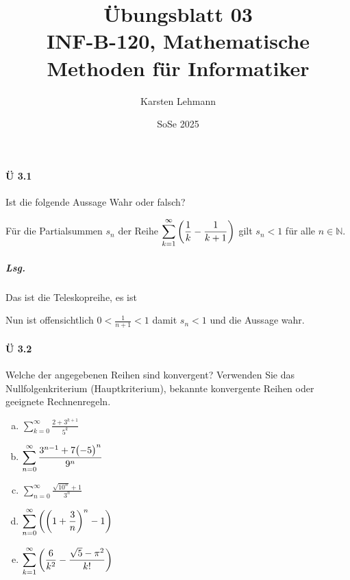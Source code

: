 \documentclass{scrreprt}
\author{Karsten Lehmann}
\date{SoSe 2025}
\title{Übungsblatt 03\\INF-B-120, Mathematische Methoden für Informatiker}
\begin{document}
\paragraph{Ü 3.1} Ist die folgende Aussage Wahr oder falsch?

Für die Partialsummen $s_n$ der Reihe
$\displaystyle \sum_{k = 1}^{\infty} \qty(\frac{1}{k} - \frac{1}{k + 1})$
gilt $s_n < 1$ für alle $n \in \mathbb{N}$.

\subparagraph{Lsg.} Das ist die Teleskopreihe, es ist
Nun ist offensichtlich $0 < \frac{1}{n + 1} < 1$ damit $s_n < 1$ und die Aussage
wahr.

\paragraph{Ü 3.2} Welche der angegebenen Reihen sind konvergent?
Verwenden Sie das Nullfolgenkriterium (Hauptkriterium), bekannte konvergente
Reihen oder geeignete Rechnenregeln.

\begin{multicols}{3}
  \begin{enumerate}[(a)]
  \item $\displaystyle \sum_{k = 0}^{\infty} \frac{2 + 3^{k + 1}}{5^k}$
  \item $\displaystyle \sum_{n = 0}^{\infty} \frac{3^{n - 1} + 7\qty\big(-5)^n}{9^n}$
  \item $\displaystyle \sum_{n = 0}^{\infty} \frac{\sqrt{10^n} + 1}{3^n}$
  \item $\displaystyle \sum_{n = 0}^{\infty} \qty(\qty(1 + \frac{3}{n})^n - 1)$
  \item $\displaystyle \sum_{k = 1}^{\infty} \qty(\frac{6}{k^2} - \frac{\sqrt{5} - \pi^2}{k!})$
  \end{enumerate}
\end{multicols}
\end{document}
